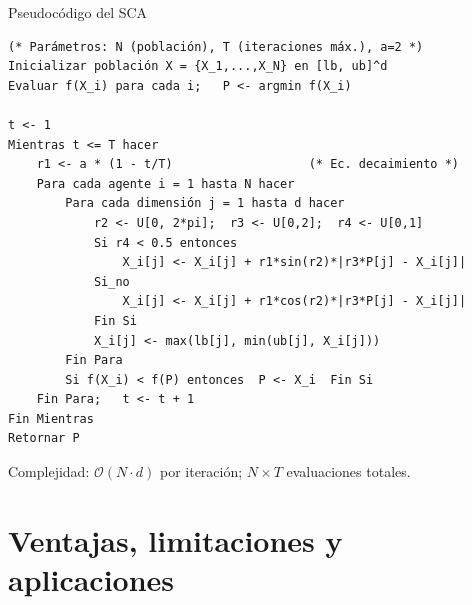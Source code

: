 \documentclass[aspectratio=169]{beamer}
\begin{document}
\begin{frame}[fragile]{Pseudocódigo del SCA}
\begin{lstlisting}
(* Parámetros: N (población), T (iteraciones máx.), a=2 *)
Inicializar población X = {X_1,...,X_N} en [lb, ub]^d
Evaluar f(X_i) para cada i;   P <- argmin f(X_i)

t <- 1
Mientras t <= T hacer
    r1 <- a * (1 - t/T)                   (* Ec. decaimiento *)
    Para cada agente i = 1 hasta N hacer
        Para cada dimensión j = 1 hasta d hacer
            r2 <- U[0, 2*pi];  r3 <- U[0,2];  r4 <- U[0,1]
            Si r4 < 0.5 entonces
                X_i[j] <- X_i[j] + r1*sin(r2)*|r3*P[j] - X_i[j]|
            Si_no
                X_i[j] <- X_i[j] + r1*cos(r2)*|r3*P[j] - X_i[j]|
            Fin Si
            X_i[j] <- max(lb[j], min(ub[j], X_i[j]))
        Fin Para
        Si f(X_i) < f(P) entonces  P <- X_i  Fin Si
    Fin Para;   t <- t + 1
Fin Mientras
Retornar P
\end{lstlisting}
  \vspace{0.2em}
  \small Complejidad: $\mathcal{O}(N \cdot d)$ por iteración; $N \times T$ evaluaciones totales.
\end{frame}

\section{Ventajas, limitaciones y aplicaciones}
\end{document}
